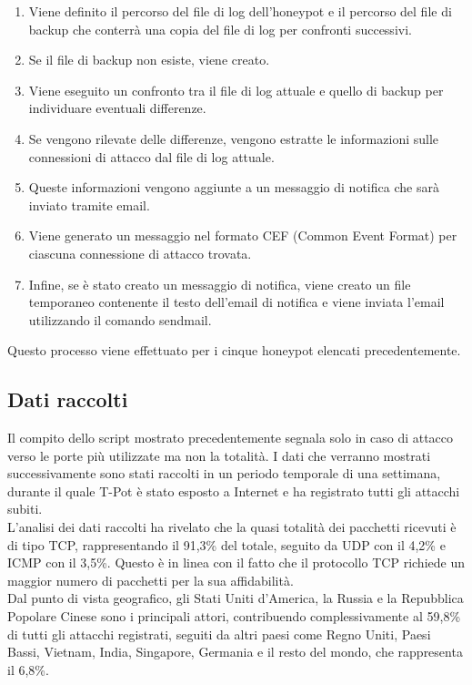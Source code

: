 \documentclass[12pt,a4paper,oneside,onecolumn,openright]{book}
\begin{document}
	\begin{enumerate}
		\item Viene definito il percorso del file di log dell'honeypot e il percorso del file di backup che conterrà una copia del file di log per confronti successivi.
		\item Se il file di backup non esiste, viene creato.
		\item Viene eseguito un confronto tra il file di log attuale e quello di backup per individuare eventuali differenze.
		\item Se vengono rilevate delle differenze, vengono estratte le informazioni sulle connessioni di attacco dal file di log attuale.
		\item Queste informazioni vengono aggiunte a un messaggio di notifica che sarà inviato tramite email.
		\item Viene generato un messaggio nel formato CEF (Common Event Format) per ciascuna connessione di attacco trovata.
		\item Infine, se è stato creato un messaggio di notifica, viene creato un file temporaneo contenente il testo dell'email di notifica e viene inviata l'email utilizzando il comando sendmail.
	\end{enumerate}
	Questo processo viene effettuato per i cinque honeypot elencati precedentemente.
	
	\subsection{Dati raccolti}
	Il compito dello script mostrato precedentemente segnala solo in caso di attacco verso le porte più utilizzate ma non la totalità.
	I dati che verranno mostrati successivamente sono stati raccolti in un periodo temporale di una settimana, durante il quale T-Pot è stato esposto a Internet e ha registrato tutti gli attacchi subiti.\\
	
	L'analisi dei dati raccolti ha rivelato che la quasi totalità dei pacchetti ricevuti è di tipo TCP, rappresentando il 91,3\% del totale, seguito da UDP con il 4,2\% e ICMP con il 3,5\%. Questo è in linea con il fatto che il protocollo TCP richiede un maggior numero di pacchetti per la sua affidabilità.\\
	
	Dal punto di vista geografico, gli Stati Uniti d'America, la Russia e la Repubblica Popolare Cinese sono i principali attori, contribuendo complessivamente al 59,8\% di tutti gli attacchi registrati, seguiti da altri paesi come Regno Uniti, Paesi Bassi, Vietnam, India, Singapore, Germania e il resto del mondo, che rappresenta il 6,8\%.\\
	
\end{document}
